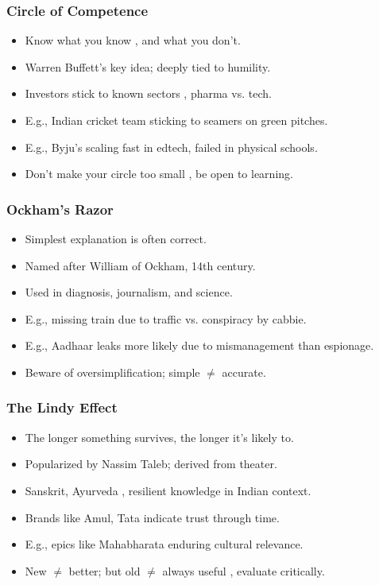 \begin{frame}[fragile]\frametitle{Circle of Competence}
  \begin{itemize}
    \item Know what you know , and what you don't.
    \item Warren Buffett's key idea; deeply tied to humility.
    \item Investors stick to known sectors , pharma vs. tech.
    \item E.g., Indian cricket team sticking to seamers on green pitches.
    \item E.g., Byju's scaling fast in edtech, failed in physical schools.
    \item Don't make your circle too small , be open to learning.
  \end{itemize}
\end{frame}

\begin{frame}[fragile]\frametitle{Ockham's Razor}
  \begin{itemize}
    \item Simplest explanation is often correct.
    \item Named after William of Ockham, 14th century.
    \item Used in diagnosis, journalism, and science.
    \item E.g., missing train due to traffic vs. conspiracy by cabbie.
    \item E.g., Aadhaar leaks more likely due to mismanagement than espionage.
    \item Beware of oversimplification; simple $\neq$ accurate.
  \end{itemize}
\end{frame}

\begin{frame}[fragile]\frametitle{The Lindy Effect}
  \begin{itemize}
    \item The longer something survives, the longer it's likely to.
    \item Popularized by Nassim Taleb; derived from theater.
    \item Sanskrit, Ayurveda , resilient knowledge in Indian context.
    \item Brands like Amul, Tata indicate trust through time.
    \item E.g., epics like Mahabharata enduring cultural relevance.
    \item New $\neq$ better; but old $\neq$ always useful , evaluate critically.
  \end{itemize}
\end{frame}

